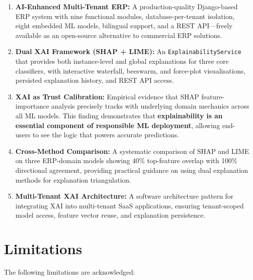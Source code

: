 \documentclass[12pt,a4paper]{report}
\begin{document}
\begin{enumerate}[label=\arabic*.]
  \item \textbf{AI-Enhanced Multi-Tenant ERP:} A production-quality Django-based ERP system with nine functional modules, database-per-tenant isolation, eight embedded ML models, bilingual support, and a REST API---freely available as an open-source alternative to commercial ERP solutions.

  \item \textbf{Dual XAI Framework (SHAP + LIME):} An \texttt{ExplainabilityService} that provides both instance-level and global explanations for three core classifiers, with interactive waterfall, beeswarm, and force-plot visualisations, persisted explanation history, and REST API access.

  \item \textbf{XAI as Trust Calibration:} Empirical evidence that SHAP feature-importance analysis precisely tracks with underlying domain mechanics across all ML models. This finding demonstrates that \textbf{explainability is an essential component of responsible ML deployment}, allowing end-users to see the logic that powers accurate predictions.

  \item \textbf{Cross-Method Comparison:} A systematic comparison of SHAP and LIME on three ERP-domain models showing 40\% top-feature overlap with 100\% directional agreement, providing practical guidance on using dual explanation methods for explanation triangulation.

  \item \textbf{Multi-Tenant XAI Architecture:} A software architecture pattern for integrating XAI into multi-tenant SaaS applications, ensuring tenant-scoped model access, feature vector reuse, and explanation persistence.
\end{enumerate}

\section{Limitations}
\label{sec:limitations}

The following limitations are acknowledged:
\end{document}
